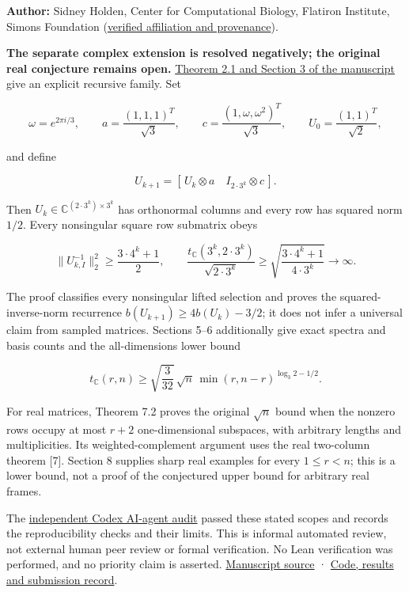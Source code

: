 \documentclass[11pt,a4paper]{article}
\begin{document}
\textbf{Author:} Sidney Holden, Center for Computational Biology,
Flatiron Institute, Simons Foundation
(\href{https://github.com/ajt60gaibb/OpenProblemsInNLA/blob/main/references/holden-ra18-2026-09-13/SUBMISSION.md}{verified
affiliation and provenance}).

\textbf{The separate complex extension is resolved negatively; the
original real conjecture remains open.}
\href{https://github.com/ajt60gaibb/OpenProblemsInNLA/blob/main/references/holden-ra18-2026-09-13/manuscript/ra18.pdf}{Theorem
2.1 and Section 3 of the manuscript} give an explicit recursive family.
Set

\[\omega=e^{2\pi i/3},\qquad
 a=\frac{(1,1,1)^T}{\sqrt3},\qquad
 c=\frac{(1,\omega,\omega^2)^T}{\sqrt3},\qquad
 U_0=\frac{(1,1)^T}{\sqrt2},\]

and define

\[U_{k+1}=[\,U_k\otimes a\quad I_{2\cdot3^k}\otimes c\,].\]

Then \(U_k\in\mathbb C^{(2\cdot3^k)\times3^k}\) has orthonormal columns
and every row has squared norm \(1/2\). Every nonsingular square row
submatrix obeys

\[\|U_{k,I}^{-1}\|_2^2\ge\frac{3\cdot4^k+1}{2},
\qquad
\frac{t_{\mathbb C}(3^k,2\cdot3^k)}{\sqrt{2\cdot3^k}}
\ge\sqrt{\frac{3\cdot4^k+1}{4\cdot3^k}}\longrightarrow\infty.\]

The proof classifies every nonsingular lifted selection and proves the
squared-inverse-norm recurrence \(b(U_{k+1})\ge4b(U_k)-3/2\); it does
not infer a universal claim from sampled matrices. Sections 5--6
additionally give exact spectra and basis counts and the all-dimensions
lower bound

\[t_{\mathbb C}(r,n)\ge\sqrt{\frac3{32}}\,\sqrt n\,
\min(r,n-r)^{\log_3 2-1/2}.\]

For real matrices, Theorem 7.2 proves the original \(\sqrt n\) bound
when the nonzero rows occupy at most \(r+2\) one-dimensional subspaces,
with arbitrary lengths and multiplicities. Its weighted-complement
argument uses the real two-column theorem {[}7{]}. Section 8 supplies
sharp real examples for every \(1\le r< n\); this is a lower bound, not
a proof of the conjectured upper bound for arbitrary real frames.

The
\href{https://github.com/ajt60gaibb/OpenProblemsInNLA/blob/main/references/holden-ra18-2026-09-13/independent-review.md}{independent
Codex AI-agent audit} passed these stated scopes and records the
reproducibility checks and their limits. This is informal automated
review, not external human peer review or formal verification. No Lean
verification was performed, and no priority claim is asserted.
\href{https://github.com/ajt60gaibb/OpenProblemsInNLA/blob/main/references/holden-ra18-2026-09-13/manuscript/ra18.tex}{Manuscript
source} ·
\href{https://github.com/ajt60gaibb/OpenProblemsInNLA/blob/main/references/holden-ra18-2026-09-13/README.md}{Code,
results and submission record}.
\end{document}
